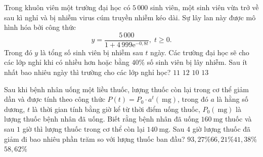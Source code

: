 \begin{ex}%
	Trong khuôn viên một trường đại học có $5\,000$ sinh viên, một  sinh viên vừa trở về sau kì nghỉ và bị nhiễm virus cúm truyền nhiễm kéo dài. Sự lây lan này được mô hình hóa bởi công thức
	$$y=\dfrac{5\,000}{1+4\,999\mathrm{e}^{-0{,}8t}},\;  t\ge0.$$
	Trong đó $y$ là tổng số sinh viên bị nhiễm sau $t$ ngày.  Các trường đại học sẽ cho các lớp nghỉ khi có nhiều hơn hoặc bằng $40\%$ số sinh viên bị lây nhiễm. Sau ít nhất bao nhiêu ngày thì trường cho các lớp nghỉ học?
	\choice 
		{\True $11$} 
		 {$12$}
		 {$10$}
		 {$13$}
\end{ex}

\begin{ex}%
	Sau khi bệnh nhân uống một liều thuốc, lượng thuốc còn lại trong cơ thể giảm dần và được tính theo công thức $P(t)=P_0 \cdot a^t(\mathrm{~mg})$, trong đó $a$ là hằng số dương, $t$ là thời gian tính bằng giờ kể từ thời điểm uống thuốc, $P_0(\mathrm{~mg})$ là lượng thuốc bệnh nhân đã uống. Biết rằng bệnh nhân đã uống $160 \mathrm{~mg}$ thuốc và sau $1$ giờ thì lượng  thuốc trong cơ thể còn lại $140 \mathrm{~mg}$. Sau $4$ giờ lượng thuốc đã giảm đi bao nhiêu phần trăm so với lượng thuốc ban đầu?
	\choice 
		{$93{,}27\%$}{$66{,}21\%$}{\True  $41{,}38\%$}{$58{,}62\%$}
\end{ex}


